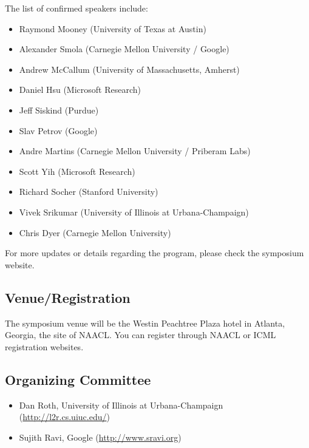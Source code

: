 The list of confirmed speakers include:

\begin{itemize}

\item Raymond Mooney (University of Texas at Austin)
\item Alexander Smola (Carnegie Mellon University / Google)
\item Andrew McCallum (University of Massachusetts, Amherst)
\item Daniel Hsu (Microsoft Research)
\item Jeff Siskind (Purdue)
\item Slav Petrov (Google)
\item Andre Martins (Carnegie Mellon University / Priberam Labs)
\item Scott Yih (Microsoft Research)
\item Richard Socher (Stanford University)
\item Vivek Srikumar (University of Illinois at Urbana-Champaign)
\item Chris Dyer (Carnegie Mellon University)
\end{itemize}

For more updates or details regarding the program, please check the symposium website.

\subsection{Venue/Registration}

The symposium venue will be the Westin Peachtree Plaza hotel in Atlanta, Georgia, the site of
NAACL. You can register through NAACL or ICML registration websites.

\subsection{Organizing Committee}

\begin{itemize}
\item Dan Roth, University of Illinois at Urbana-Champaign (\url{http://l2r.cs.uiuc.edu/})
\item Sujith Ravi, Google (\url{http://www.sravi.org})
\end{itemize}
